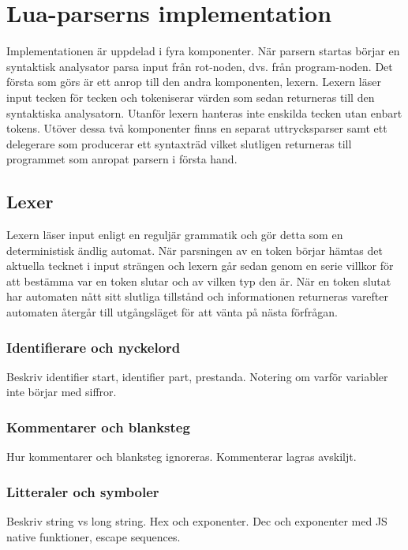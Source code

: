 \section{Lua-parserns implementation}

Implementationen är uppdelad i fyra komponenter. När parsern startas börjar
en syntaktisk analysator parsa input från rot-noden, dvs. från program-noden.
Det första som görs är ett anrop till den andra komponenten, lexern. Lexern
läser input tecken för tecken och tokeniserar värden som sedan returneras
till den syntaktiska analysatorn. Utanför lexern hanteras inte enskilda tecken
utan enbart tokens. Utöver dessa två komponenter finns en separat
uttrycksparser samt ett delegerare som producerar ett syntaxträd vilket
slutligen returneras till programmet som anropat parsern i första hand.

\subsection{Lexer}

Lexern läser input enligt en reguljär grammatik och gör detta som en
deterministisk ändlig automat. När parsningen av en token börjar hämtas det
aktuella tecknet i input strängen och lexern går sedan genom en serie villkor
för att bestämma var en token slutar och av vilken typ den är. När en token
slutat har automaten nått sitt slutliga tillstånd och informationen returneras
varefter automaten återgår till utgångsläget för att vänta på nästa förfrågan.

\subsubsection{Identifierare och nyckelord}

Beskriv identifier start, identifier part, prestanda. Notering om varför
variabler inte börjar med siffror.

\subsubsection{Kommentarer och blanksteg}

Hur kommentarer och blanksteg ignoreras. Kommenterar lagras avskiljt.

\subsubsection{Litteraler och symboler}

Beskriv string vs long string. Hex och exponenter. Dec och exponenter med JS
native funktioner, escape sequences.

